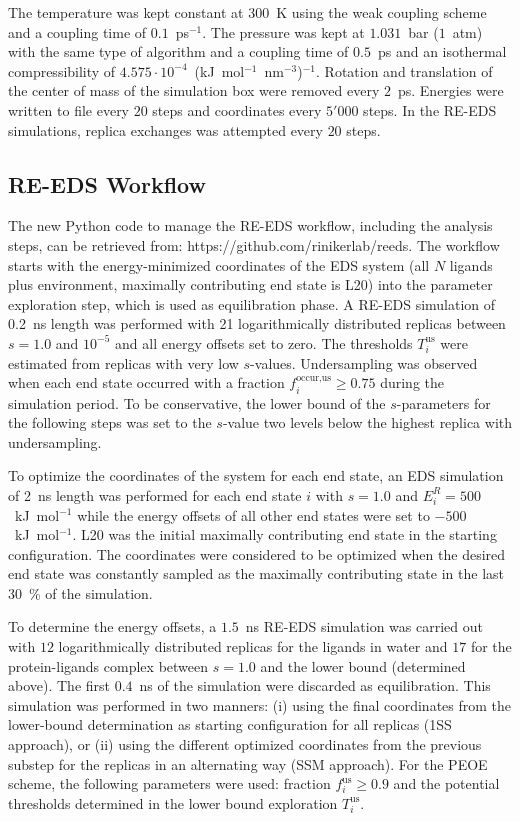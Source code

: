 The temperature was kept constant at $300$~K using the weak coupling scheme \cite{Berendsen1984} and a coupling time of $0.1$~ps$^{-1}$. The pressure was kept at $1.031$~bar ($1$~atm) with the same type of algorithm and a coupling time of $0.5$~ps and an isothermal compressibility of $4.575 \cdot 10^{-4}$~(kJ~mol$^{-1}$~nm$^{-3}$)$^{-1}$.
Rotation and translation of the center of mass of the simulation box were removed every $2$~ps. 
Energies were written to file every $20$ steps and coordinates every $5'000$ steps.
In the RE-EDS simulations, replica exchanges was attempted every $20$ steps.

\subsection{RE-EDS Workflow}
The new Python code to manage the RE-EDS workflow, including the analysis steps, can be retrieved from: https://github.com/rinikerlab/reeds.
The workflow starts with the energy-minimized coordinates of the EDS system (all $N$ ligands plus environment, maximally contributing end state is L20) into the parameter exploration step, which is used as equilibration phase.
A RE-EDS simulation of 0.2~ns length was performed with 21 logarithmically distributed replicas between $s=1.0$ and $10^{-5}$ and all energy offsets set to zero.  
The thresholds $T_{i}^{\text{us}}$ were estimated from replicas with very low $s$-values.
Undersampling was observed when each end state occurred with a fraction $f_{i}^{\text{occur,us}} \ge 0.75$ during the simulation period.
To be conservative, the lower bound of the $s$-parameters for the following steps was set to the $s$-value two levels below the highest replica with undersampling.

To optimize the coordinates of the system for each end state, an EDS simulation of 2~ns length was performed for each end state $i$ with $s=1.0$ and $E^R_i=500$~kJ~mol$^{-1}$ while the energy offsets of all other end states were set to $-500$~kJ~mol$^{-1}$. L20 was the initial maximally contributing end state in the starting configuration. 
The coordinates were considered to be optimized when the desired end state was constantly sampled as the maximally contributing state in the last 30~\% of the simulation. 

To determine the energy offsets, a $1.5$~ns RE-EDS simulation was carried out with $12$ logarithmically distributed replicas for the ligands in water and $17$ for the protein-ligands complex between $s=1.0$ and the lower bound (determined above). The first $0.4$~ns of the simulation were discarded as equilibration. This simulation was performed in two manners: (i) using the final coordinates from the lower-bound determination as starting configuration for all replicas (1SS approach), or (ii) using the different optimized coordinates from the previous substep for the replicas in an alternating way (SSM approach). 
For the PEOE \cite{Sidler2016} scheme, the following parameters were used: fraction $f_{i}^{\text{us}} \ge 0.9$ and the potential thresholds determined in the lower bound exploration $T_{i}^{\text{us}}$.


